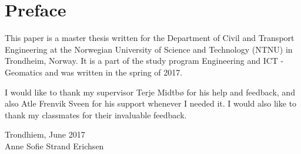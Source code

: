 \chapter*{Preface}
%

This paper is a master thesis written for the Department of Civil and Transport Engineering at the Norwegian University of Science and Technology (NTNU) in Trondheim, Norway. It is a part of the study program Engineering and ICT - Geomatics and was written in the spring of 2017. 

I would like to thank my supervisor Terje Midtbø for his help and feedback, and also Atle Frenvik Sveen for his support whenever I needed it. I would also like to thank my classmates for their invaluable feedback. \newline

\begin{center}
	
	Trondhiem, June 2017\\
	Anne Sofie Strand Erichsen
	
\end{center}